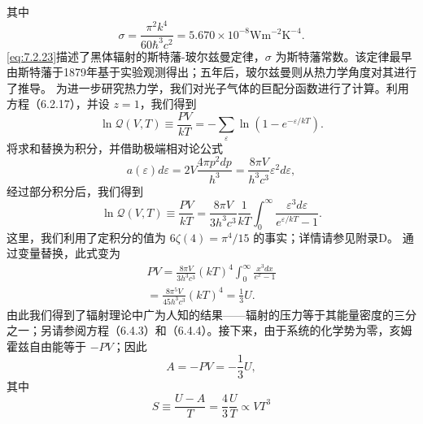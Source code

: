 其中
\begin{equation}\tag{7.2.23}\label{eq:7.2.23}
\sigma = \frac { \pi ^{2} k ^{4} } { 60 \hbar ^{3} c ^{2} } = 5 . 67 0 \times 10 ^{- 8} \mathrm { W m ^{- 2} K ^{- 4} } .
\end{equation}
\autoref{eq:7.2.23}描述了黑体辐射的斯特藩-玻尔兹曼定律，\(\sigma\) 为斯特藩常数。该定律最早由斯特藩于1879年基于实验观测得出；五年后，玻尔兹曼则从热力学角度对其进行了推导。
为进一步研究热力学，我们对光子气体的巨配分函数进行了计算。利用方程（6.2.17），并设 \(z=1\)，我们得到
\begin{equation}\tag{7.2.24}\label{eq:7.2.24}
\ln \mathcal { Q } ( V , T ) \equiv \frac { P V } { k T } = - \sum _ { \varepsilon } \ln ( 1 - e ^{- \varepsilon / k T} ) .
\end{equation}
将求和替换为积分，并借助极端相对论公式
\begin{equation}\tag{7.2.25}\label{eq:7.2.25}
a ( \varepsilon ) d \varepsilon = 2 V \frac { 4 \pi p ^{2} d p } { h ^{3} } = \frac { 8 \pi V } { h ^{3} c ^{3} } \varepsilon ^{2} d \varepsilon ,
\end{equation}
经过部分积分后，我们得到
\begin{equation}\tag{7.2.26}\label{eq:7.2.26}
\ln \mathcal { Q } ( V , T ) \equiv \frac { P V } { k T } = \frac { 8 \pi V } { 3 h ^{3} c ^{3} } \frac { 1 } { k T } \int _ { 0 } ^{\infty} \frac { \varepsilon ^{3} d \varepsilon } { e ^{\varepsilon / k T} - 1 } .
\end{equation}
这里，我们利用了定积分的值为 \(6\zeta(4)=\pi^{4}/15\) 的事实；详情请参见附录D。
通过变量替换，此式变为
\begin{equation}\tag{7.2.27}\label{eq:7.2.27}
\begin{array}{r} { P V = \frac { 8 \pi V } { 3 h ^{3} c ^{3} } ( k T ) ^{4} \int _ { 0 } ^{\infty} \frac { x ^{3} d x } { e ^{x} - 1 } } \\{ = \frac { 8 \pi ^{5} V } { 45 h ^{3} c ^{3} } ( k T ) ^{4} = \frac { 1 } { 3 } U . } \end{array}
\end{equation}
由此我们得到了辐射理论中广为人知的结果——辐射的压力等于其能量密度的三分之一；另请参阅方程（6.4.3）和（6.4.4）。接下来，由于系统的化学势为零，亥姆霍兹自由能等于 \(-PV\)；因此
\begin{equation}\tag{7.2.28}\label{eq:7.2.28}
A = - P V = - { \frac { 1 } { 3 } } U ,
\end{equation}
其中
\begin{equation}\tag{7.2.29}\label{eq:7.2.29}
S \equiv { \frac { U - A } { T } } = { \frac { 4 } { 3 } } { \frac { U } { T } } \propto V T ^{3}
\end{equation}

